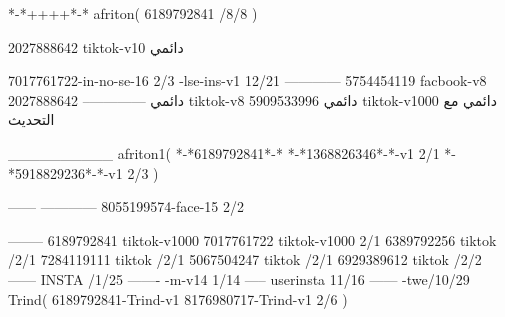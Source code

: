 *-*++++*-*
afriton(
6189792841 /8/8
)

2027888642 tiktok-v10
دائمي

7017761722-in-no-se-16 2/3
-lse-ins-v1 12/21
------------
5754454119 facbook-v8
دائمي
--------------
2027888642 tiktok-v8
دائمي
5909533996 tiktok-v1000
دائمي مع التحديث

__________
afriton1(
*-*6189792841*-*
*-*1368826346*-*-v1 2/1
*-*5918829236*-*-v1 2/3
)

------
------------
8055199574-face-15 2/2

--------
6189792841 tiktok-v1000
7017761722 tiktok-v1000 2/1
6389792256 tiktok /2/1
7284119111 tiktok /2/1
5067504247 tiktok /2/1
6929389612 tiktok /2/2
------
 INSTA /1/25
-------
-m-v14 1/14
-----
userinsta 11/16
------
-twe/10/29
Trind(
6189792841-Trind-v1 
8176980717-Trind-v1 2/6
)
